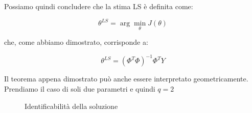 Possiamo quindi concludere che la stima LS è definita come:

  \[ \theta^{LS}=\arg \min_{\theta} J(\theta) \]
  
che, come abbiamo dimostrato, corrisponde a:

  \[ \theta^{LS}=(\Phi^T\Phi)^{-1}\Phi^TY \]

Il teorema appena dimostrato può anche essere interpretato geometricamente. Prendiamo il caso di soli due parametri e quindi $q=2$

\begin{figure}[htbp]
  \centering
  \caption{Identificabilità della soluzione\label{fig:identificabilitasoluzione}}
\end{figure}


